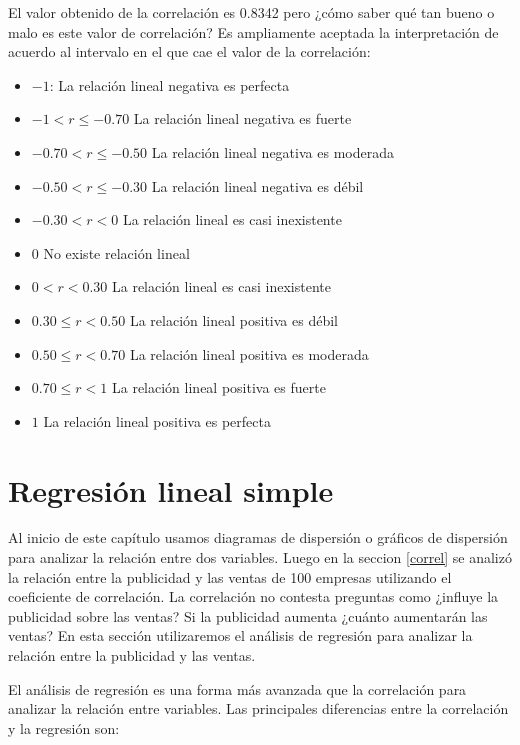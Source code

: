 \documentclass[letterpaper,]{book}
\providecommand{\tightlist}{%
  \setlength{\itemsep}{0pt}\setlength{\parskip}{0pt}}
\begin{document}
El valor obtenido de la correlación es 0.8342 pero ¿cómo saber qué tan bueno o malo es este valor de correlación? Es ampliamente aceptada la interpretación de acuerdo al intervalo en el que cae el valor de la correlación:

\begin{itemize}
\tightlist
\item
  \(-1\): La relación lineal negativa es perfecta
\item
  \(-1<r \leq -0.70\) La relación lineal negativa es fuerte
\item
  \(-0.70<r \leq -0.50\) La relación lineal negativa es moderada
\item
  \(-0.50<r \leq -0.30\) La relación lineal negativa es débil
\item
  \(-0.30<r < 0\) La relación lineal es casi inexistente
\item
  \(0\) No existe relación lineal
\item
  \(0<r < 0.30\) La relación lineal es casi inexistente
\item
  \(0.30 \leq r < 0.50\) La relación lineal positiva es débil
\item
  \(0.50 \leq r < 0.70\) La relación lineal positiva es moderada
\item
  \(0.70 \leq r < 1\) La relación lineal positiva es fuerte
\item
  \(1\) La relación lineal positiva es perfecta
\end{itemize}

\hypertarget{lineal}{%
\section{Regresión lineal simple}\label{lineal}}

Al inicio de este capítulo usamos diagramas de dispersión o gráficos de dispersión para analizar la relación entre dos variables. Luego en la seccion \ref{correl} se analizó la relación entre la publicidad y las ventas de 100 empresas utilizando el coeficiente de correlación. La correlación no contesta preguntas como ¿influye la publicidad sobre las ventas? Si la publicidad aumenta ¿cuánto aumentarán las ventas? En esta sección utilizaremos el análisis de regresión para analizar la relación entre la publicidad y las ventas.

El análisis de regresión es una forma más avanzada que la correlación para analizar la relación entre variables. Las principales diferencias entre la correlación y la regresión son:
\end{document}
